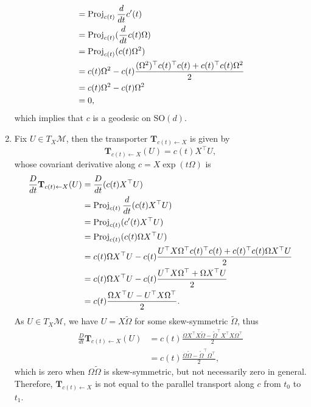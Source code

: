 \documentclass[en, oneside]{assignment}
\begin{document}
\begin{sol}
\begin{enumerate}[label=(\arabic*)]
\begin{align*}
            &= \operatorname{Proj} _{c(t)} \frac{d}{dt} c'(t)\\
            &= \operatorname{Proj} _{c(t)} (\frac{d}{dt} c(t) \Omega)\\
            &= \operatorname{Proj} _{c(t)} (c(t) \Omega^2)\\
            &= c(t) \Omega^2 - c(t) \frac{(\Omega^2)^\top c(t)^\top c(t) + c(t)^\top c(t) \Omega^2}{2}\\
            &= c(t) \Omega^2 - c(t) \Omega^2\\
            &= 0,
        \end{align*}
        which implies that $c$ is a geodesic on $\text{SO}(d)$.
        \item Fix $U \in T_X \mathcal{M}$, then the transporter $\mathbf{T}_{c(t) \leftarrow X}$ is given by
        \begin{equation*}
            \mathbf{T}_{c(t) \leftarrow X} (U) = c(t) X^\top U,
        \end{equation*}
        whose covariant derivative along $c = X \exp(t \Omega)$ is
        \begin{align*}
            \frac{D}{dt} \mathbf{T}_{c(t) \leftarrow X} (U) &= \frac{D}{dt} (c(t) X^\top U)\\
            &= \operatorname{Proj} _{c(t)} \frac{d}{dt} (c(t) X^\top U)\\
            &= \operatorname{Proj} _{c(t)} (c'(t) X^\top U)\\
            &= \operatorname{Proj} _{c(t)} (c(t) \Omega X^\top U)\\
            &= c(t) \Omega X^\top U - c(t) \frac{U^\top X \Omega^\top c(t)^\top c(t) + c(t)^\top c(t) \Omega X^\top U}{2}\\
            &= c(t) \Omega X^\top U - c(t) \frac{U^\top X \Omega^\top + \Omega X^\top U}{2}\\
            &= c(t) \frac{\Omega X^\top U - U^\top X \Omega^\top}{2}.
        \end{align*}
        As $U \in T_X \mathcal{M}$, we have $U = X \tilde \Omega$ for some skew-symmetric $\tilde \Omega$, thus
        \begin{align*}
            \frac{D}{dt} \mathbf{T}_{c(t) \leftarrow X} (U) &= c(t) \frac{\Omega X^\top X \tilde \Omega - \tilde \Omega^\top X^\top X \Omega^\top}{2}\\
            &= c(t) \frac{\Omega \tilde \Omega - \tilde \Omega^\top \Omega^\top}{2},
        \end{align*}
        which is zero when $\Omega \tilde \Omega$ is skew-symmetric, but not necessarily zero in general.\\
        Therefore, $\mathbf{T}_{c(t) \leftarrow X}$ is not equal to the parallel transport along $c$ from $t_0$ to $t_1$.
    \end{enumerate}
\end{sol}
\end{document}
